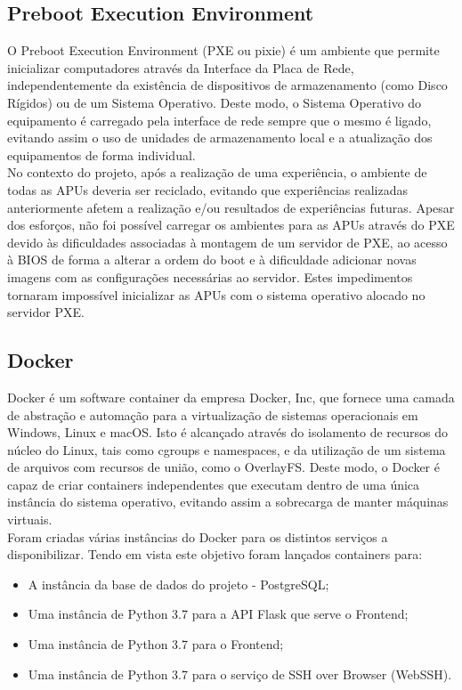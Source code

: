 \subsection{Preboot Execution Environment}
O Preboot Execution Environment (PXE ou pixie) é um ambiente que permite inicializar computadores através da Interface da Placa de Rede, independentemente da existência de dispositivos de armazenamento (como Disco Rígidos) ou de um Sistema Operativo. Deste modo, o Sistema Operativo do equipamento é carregado pela interface de rede sempre que o mesmo é ligado, evitando assim o uso de unidades de armazenamento local e a atualização dos equipamentos de forma individual.\cite{pxe}\newline\\
No contexto do projeto, após a realização de uma experiência, o ambiente de todas as APUs deveria ser reciclado, evitando que experiências realizadas anteriormente afetem a realização e/ou resultados de experiências futuras.\newline
Apesar dos esforços, não foi possível carregar os ambientes para as APUs através do PXE devido às dificuldades associadas à montagem de um servidor de PXE, ao acesso à BIOS de forma a alterar a ordem do boot e à dificuldade adicionar novas imagens com as configurações necessárias ao servidor. Estes impedimentos tornaram impossível inicializar as APUs com o sistema operativo alocado no servidor PXE.



\subsection{Docker}
Docker é um software container da empresa Docker, Inc, que fornece uma camada de abstração e automação para a virtualização de sistemas operacionais em Windows, Linux e macOS. Isto é alcançado através do isolamento de recursos do núcleo do Linux, tais como cgroups e namespaces, e da utilização de um sistema de arquivos com recursos de união, como o OverlayFS. Deste modo, o Docker é capaz de criar containers independentes que executam dentro de uma única instância do sistema operativo, evitando assim a sobrecarga de manter máquinas virtuais.\cite{docker}\newline\\
Foram criadas várias instâncias do Docker para os distintos serviços a disponibilizar. Tendo em vista este objetivo foram lançados containers para:
\begin{itemize}
    \item A instância da base de dados do projeto - PostgreSQL;
    \item Uma instância de Python 3.7 para a API Flask que serve o Frontend;
    \item Uma instância de Python 3.7 para o Frontend;
    \item Uma instância de Python 3.7 para o serviço de SSH over Browser (WebSSH).
\end{itemize}


